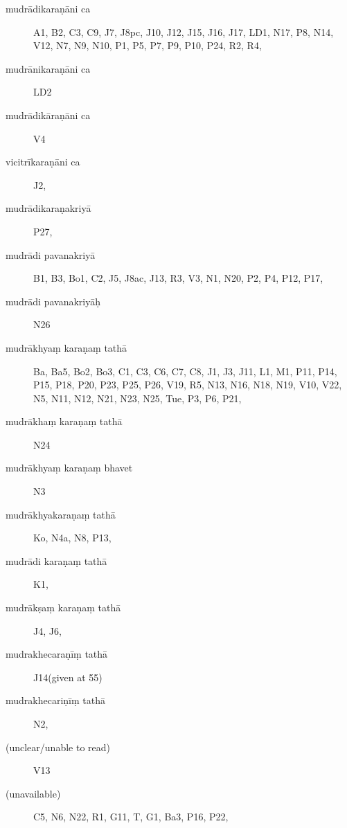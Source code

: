 \begin{ekdosis}
\begin{marma}[hp01_055]
\begin{marma}[hp01_056]
  \begin{description}
  \item[mudrādikaraṇāni ca] A1, B2, C3, C9, J7, J8pc, J10, J12, J15, J16, J17, LD1, N17, P8, N14, V12, N7, N9, N10, P1, P5, P7, P9, P10, P24, R2, R4, 
  \item[mudrānikaraṇāni ca] LD2
\item[mudrādikāraṇāni ca]    V4
\item[vicitrīkaraṇāni ca]    J2,
  \item[mudrādikaraṇakriyā] P27,
\item[mudrādi pavanakriyā]    B1, B3, Bo1, C2, J5, J8ac, J13, R3, V3, N1, N20, P2, P4, P12, P17, 
\item[mudrādi pavanakriyāḥ]   N26
\item[mudrākhyaṃ karaṇaṃ tathā] Ba, Ba5, Bo2, Bo3, C1, C3, C6, C7,  C8, J1, J3, J11, L1, M1, P11, P14, P15, P18, P20, P23, P25, P26, V19, R5, N13, N16, N18, N19, V10, V22, N5, N11, N12, N21, N23, N25, Tue, P3, P6, P21, 
\item[mudrākhaṃ karaṇaṃ tathā]   N24
\item[mudrākhyaṃ karaṇaṃ bhavet]   N3
\item[mudrākhyakaraṇaṃ tathā]    Ko, N4a, N8, P13, 
\item[mudrādi karaṇaṃ tathā]    K1,
\item[mudrākṣaṃ karaṇaṃ tathā]    J4, J6,
\item[mudrakhecaraṇīṃ tathā]    J14(given at 55)
\item[mudrakhecariṇīṃ tathā]    N2, 
\item[(unclear/unable to read)]    V13
\item[(unavailable)]     C5, N6, N22, R1, G11, T, G1, Ba3, P16, P22,
    \end{description}
 \end{marma}



\end{marma}
\end{ekdosis}
